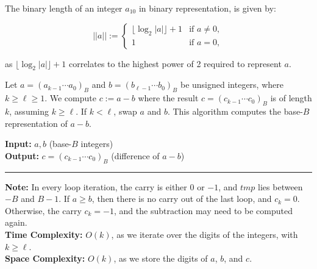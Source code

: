 \begin{Func}
    
    The binary length of an integer $a_{10}$ in binary representation, is given by:
    
    \[
    ||a|| := 
    \begin{cases} 
    \lfloor \log_2 |a| \rfloor + 1 & \text{if } a \neq 0, \\
    1 & \text{if } a = 0,
    \end{cases}
    \]
    
    \noindent
    as $\lfloor \log_2 |a| \rfloor + 1$ correlates to the highest power of 2 required to represent $a$.
\end{Func}
\newpage
\begin{Func}
    Let $a = (a_{k-1} \cdots a_0)_B$ and $b = (b_{\ell-1} \cdots b_0)_B$ be unsigned integers, where $k \geq \ell \geq 1$. We compute $c := a - b$ where the result $c = (c_{k-1} \cdots c_0)_B$ is of length $k$, assuming $k \geq \ell$. If $k < \ell$, swap $a$ and $b$. This algorithm computes the base-$B$ representation of $a - b$.

    \vspace{.5em}
    \noindent
    \textbf{Input:} $a, b$ (base-$B$ integers)\\
    \textbf{Output:} $c = (c_{k-1} \cdots c_0)_B$ (difference of $a - b$)\\

    \begin{algorithm}[H]
        \SetAlgoLined
    \end{algorithm}
    \noindent\rule{\textwidth}{0.4pt}

    \noindent
    \textbf{Note:} In every loop iteration, the carry is either $0$ or $-1$, and $tmp$ lies between $-B$ and $B-1$. If $a \geq b$, then there is no carry out of the last loop, and $c_k = 0$. Otherwise, the carry $c_k = -1$, and the subtraction may need to be computed again.\\
    \textbf{Time Complexity:} $O(k)$, as we iterate over the digits of the integers, with $k \geq \ell$.\\
    \textbf{Space Complexity:} $O(k)$, as we store the digits of $a$, $b$, and $c$.
\end{Func}

